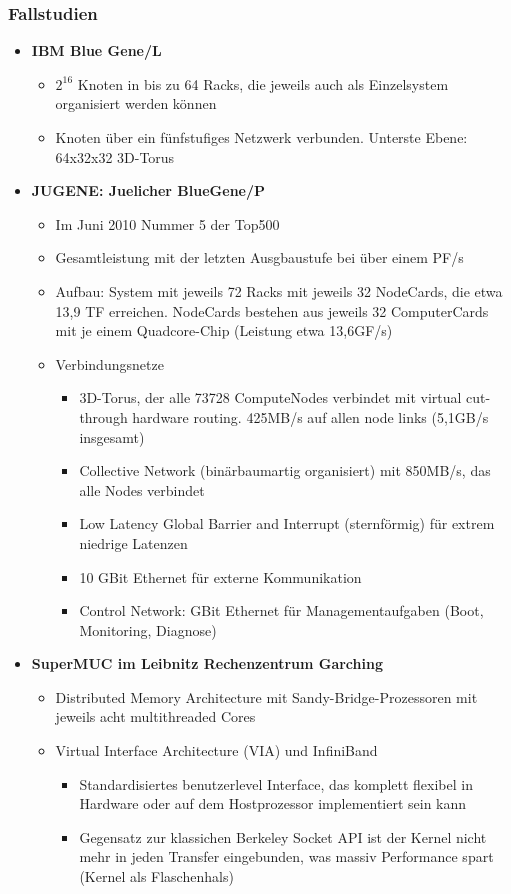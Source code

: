 \subsubsection{Fallstudien}
\begin{itemize}
	\item \textbf{IBM Blue Gene/L}
	\begin{itemize}
		\item \(2^16\) Knoten in bis zu 64 Racks, die jeweils auch als Einzelsystem organisiert werden können
		\item Knoten über ein fünfstufiges Netzwerk verbunden. Unterste Ebene: 64x32x32 3D-Torus
	\end{itemize}
	\item \textbf{JUGENE: Juelicher BlueGene/P}
	\begin{itemize}
		\item Im Juni 2010 Nummer 5 der Top500
		\item Gesamtleistung mit der letzten Ausgbaustufe bei über einem PF/s
		\item Aufbau: System mit jeweils 72 Racks mit jeweils 32 NodeCards, die etwa 13,9 TF erreichen. NodeCards bestehen aus jeweils 32 ComputerCards mit je einem Quadcore-Chip (Leistung etwa 13,6GF/s)
		\item Verbindungsnetze
		\begin{itemize}
			\item 3D-Torus, der alle 73728 ComputeNodes verbindet mit virtual cut-through hardware routing. 425MB/s auf allen node links (5,1GB/s insgesamt)
			\item Collective Network (binärbaumartig organisiert) mit 850MB/s, das alle Nodes verbindet
			\item Low Latency Global Barrier and Interrupt (sternförmig) für extrem niedrige Latenzen
			\item 10 GBit Ethernet für externe Kommunikation
			\item Control Network: GBit Ethernet für Managementaufgaben (Boot, Monitoring, Diagnose)
		\end{itemize}
	\end{itemize}
	\item \textbf{SuperMUC im Leibnitz Rechenzentrum Garching}
	\begin{itemize}
		\item Distributed Memory Architecture mit Sandy-Bridge-Prozessoren mit jeweils acht multithreaded Cores
		\item Virtual Interface Architecture (VIA) und InfiniBand
		\begin{itemize}
			\item Standardisiertes benutzerlevel Interface, das komplett flexibel in Hardware  oder auf dem Hostprozessor implementiert sein kann
			\item Gegensatz zur klassichen Berkeley Socket API ist der Kernel nicht mehr in jeden Transfer eingebunden, was massiv Performance spart (Kernel als Flaschenhals)
		\end{itemize}
	\end{itemize}
\end{itemize}



